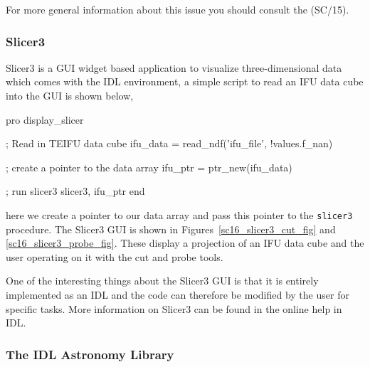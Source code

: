 \documentclass[twoside,11pt]{starlink}
\begin{document}
For more general information about this issue you should consult the
 (SC/15).

\subsubsection{Slicer3}

Slicer3 is a GUI widget based application to visualize
three-dimensional data which comes with the IDL environment, a simple
script to read an IFU data cube into the GUI is shown below,

\begin{small}
\begin{terminalv}
pro display_slicer

   ; Read in TEIFU data cube
   ifu_data = read_ndf('ifu_file', !values.f_nan)

   ; create a pointer to the data array
   ifu_ptr = ptr_new(ifu_data)

   ; run slicer3
   slicer3, ifu_ptr
end
\end{terminalv}
\end{small}

here we create a pointer to our data array and pass this pointer to
the \texttt{slicer3} procedure.  The Slicer3 GUI is shown in
Figures~\ref{sc16_slicer3_cut_fig} and
\ref{sc16_slicer3_probe_fig}.
These display a projection of an IFU data cube and
the user operating on it with the cut and probe tools.



One of the interesting things about the Slicer3 GUI is that it is
entirely implemented as an IDL 
and the code can therefore be modified by the user for specific tasks.
More information on Slicer3 can be found in the online help in IDL.

\subsubsection{The IDL Astronomy Library}
\end{document}
